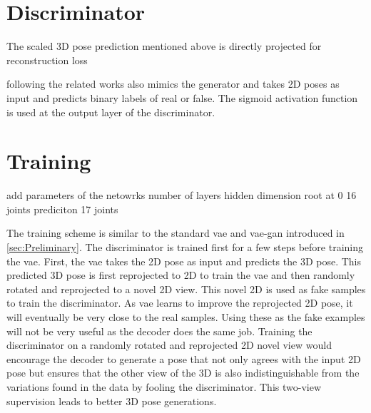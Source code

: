 

\section{Discriminator}
The scaled 3D pose prediction mentioned above is directly projected for reconstruction loss

following the related works also mimics the generator and takes 2D poses as input and predicts binary labels of real or false. The sigmoid activation function is used at the output layer of the discriminator.

\section{Training}
add parameters of the netowrks number of layers hidden dimension root at 0 16 joints prediciton 17 joints

The training scheme is similar to the standard \ac{vae} and \ac{vae}-\ac{gan} introduced in \ref{sec:Preliminary}. The discriminator is trained first for a few steps before training the \ac{vae}. First, the \ac{vae} takes the 2D pose as input and predicts the 3D pose. This predicted 3D pose is first reprojected to 2D to train the \ac{vae} and then randomly rotated and reprojected to a novel 2D view. This novel 2D is used as fake samples to train the discriminator. As \ac{vae} learns to improve the reprojected 2D pose, it will eventually be very close to the real samples. Using these as the fake examples will not be very useful as the decoder does the same job. Training the discriminator on a randomly rotated and reprojected 2D novel view would encourage the decoder to generate a pose that not only agrees with the input 2D pose but ensures that the other view of the 3D is also indistinguishable from the variations found in the data by fooling the discriminator. This two-view supervision leads to better 3D pose generations.


